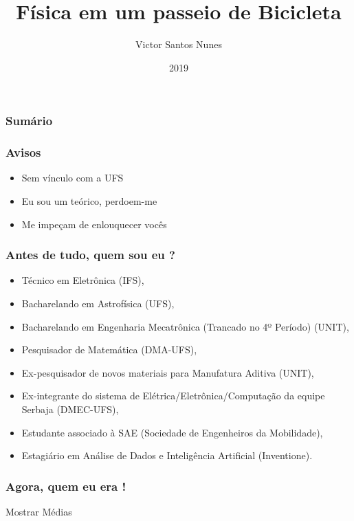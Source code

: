 \documentclass{beamer}
\title[Física em um Passeio de Bicicleta]{Física em um passeio de Bicicleta
}
\author[Victor Nunes]{Victor Santos Nunes\inst{1}}
\institute[DFI-UFS]{
	\inst{1}
	Departamento de Física\\
	Universidade Federal de Sergipe	
}
\date[2019]{2019}
\begin{document}
	\frame{\titlepage}
	
	\begin{frame}
		\frametitle{Sumário}
		\tableofcontents
	\end{frame}
	
	\begin{frame}
		\frametitle{Avisos}
		\begin{itemize}
			\item Sem vínculo com a UFS
			\item Eu sou um teórico, perdoem-me
			\item Me impeçam de enlouquecer vocês
		\end{itemize}
	\end{frame}
	
	\begin{frame}
		\frametitle{Antes de tudo, quem sou eu ?}
		\begin{itemize}
			\item<1-> Técnico em Eletrônica (IFS),
			\item Bacharelando em Astrofísica (UFS),
			\item Bacharelando em Engenharia Mecatrônica (Trancado no 4º Período) (UNIT),
			\item Pesquisador de Matemática (DMA-UFS),
			\item Ex-pesquisador de novos materiais para Manufatura Aditiva (UNIT),
			\item Ex-integrante do sistema de Elétrica/Eletrônica/Computação da equipe Serbaja (DMEC-UFS),
			\item Estudante associado à SAE (Sociedade de Engenheiros da Mobilidade),
			\item<2-> Estagiário em Análise de Dados e Inteligência Artificial (Inventione).
		\end{itemize}
	\end{frame}

	\begin{frame}
		\frametitle{Agora, quem eu era !}
		Mostrar Médias
	\end{frame}
\end{document}

